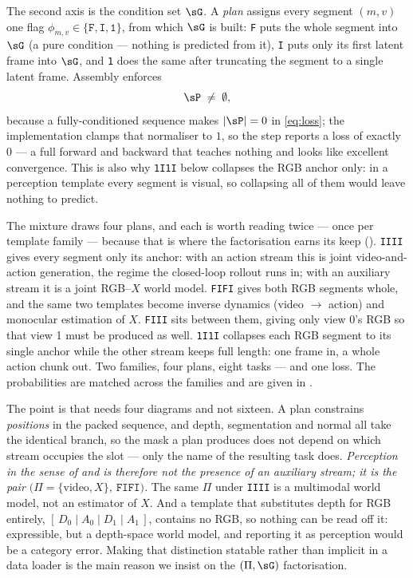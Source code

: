 \documentclass{article} %
\begin{document}
The second axis is the condition set $\sG$. A \emph{plan} assigns every segment $(m,v)$ one flag
$\phi_{m,v}\in\{\texttt{F},\texttt{I},\texttt{1}\}$, from which $\sG$ is built: \texttt{F} puts the
whole segment into $\sG$ (a pure condition --- nothing is predicted from it), \texttt{I} puts only
its first latent frame into $\sG$, and \texttt{1} does the same after truncating the segment to a
single latent frame. Assembly enforces
\begin{equation}
\sP \;\neq\; \emptyset ,
\label{eq:nonempty}
\end{equation}
because a fully-conditioned sequence makes $|\sP| = 0$ in \eqref{eq:loss}; the implementation
clamps that normaliser to $1$, so the step reports a loss of exactly $0$ --- a full forward and
backward that teaches nothing and looks like excellent convergence. This is also why \texttt{1I1I} below collapses the RGB anchor only: in a perception template every
segment is visual, so collapsing all of them would leave nothing to predict.

The mixture draws four plans, and each is worth reading twice --- once per template family ---
because that is where the factorisation earns its keep (). \texttt{IIII} gives
every segment only its anchor: with an action stream this is joint video-and-action generation,
the regime the closed-loop rollout runs in; with an auxiliary stream it is a joint RGB--$X$ world
model. \texttt{FIFI} gives both RGB segments whole, and the same two templates become inverse
dynamics (video $\to$ action) and monocular estimation of $X$. \texttt{FIII} sits between them,
giving only view 0's RGB so that view 1 must be produced as well. \texttt{1I1I} collapses each RGB
segment to its single anchor while the other stream keeps full length: one frame in, a whole
action chunk out. Two families, four plans, eight tasks --- and one loss. The probabilities are
matched across the families and are given in .

The point is that  needs four diagrams and not sixteen. A plan constrains
\emph{positions} in the packed sequence, and depth, segmentation and normal all take the identical
branch, so the mask a plan produces does not depend on which stream occupies the slot --- only the
name of the resulting task does. \emph{Perception in the sense of \citet{gabeur2026image} and
\citet{wang2026video} is therefore not the presence of an auxiliary stream; it is the pair
$\big(\Pi=\{\text{video},X\},\ \texttt{FIFI}\big)$.} The same $\Pi$ under \texttt{IIII} is a
multimodal world model, not an estimator of $X$. And a template that substitutes depth for RGB
entirely, $[\,D_0\mid A_0\mid D_1\mid A_1\,]$, contains no RGB, so nothing can be read off it:
expressible, but a depth-space world model, and reporting it as perception would be a category
error. Making that distinction statable rather than implicit in a data loader is the main reason
we insist on the $(\Pi,\sG)$ factorisation.
\end{document}
